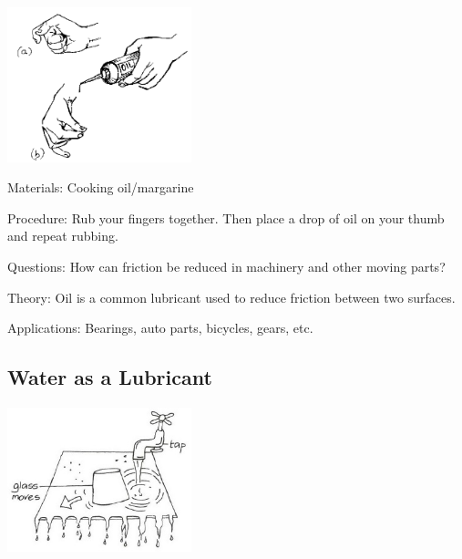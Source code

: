 \begin{multicols}{2}
\begin{center}
\includegraphics[width=0.4\textwidth]{./img/source/lubrication.png}
\end{center}

\begin{description*}
\item[Materials:]{Cooking oil/margarine}
\item[Procedure:]{Rub your fingers together. Then place a drop of oil on your thumb and repeat rubbing.}
\item[Questions:]{How can friction be reduced in machinery and other moving parts?}
\item[Theory:]{Oil is a common lubricant used to reduce friction between two surfaces.}
\item[Applications:]{Bearings, auto parts, bicycles, gears, etc.}
\end{description*}

\subsection{Water as a Lubricant}

\begin{center}
\includegraphics[width=0.4\textwidth]{./img/vso/water-lubricant.jpg}
\end{center}


\end{multicols}
